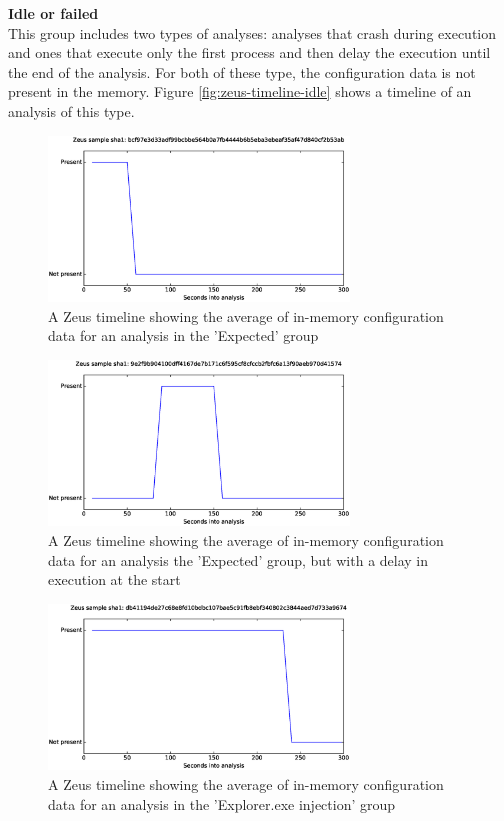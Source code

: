 \documentclass[conference]{IEEEtran}
\begin{document}
\textbf{Idle or failed}
\\This group includes two types of analyses: analyses that crash during execution and ones that execute only the first process and then delay the execution until the end of the analysis. For both of these type, the \Gls{configuration data} is not present in the memory. Figure \ref{fig:zeus-timeline-idle} shows a timeline of an analysis of this type.


\begin{figure}[h]
    \includegraphics[width=8cm,scale=0.5]{images/zeus/zeus-timelines-eps/Zeus-bcf97e3d33adf99bcbbe564b0a7fb4444b6b5eba3ebeaf35af47d840cf2b53ab.eps}
    \caption{A Zeus timeline showing the average of in-memory configuration data for an analysis in the 'Expected' group}
    \label{fig:zeus-timeline-normal}
\end{figure}
\begin{figure}[h]
    \includegraphics[width=8cm,scale=0.5]{images/zeus/zeus-timelines-eps/Zeus-9e2f9b904100dff4167de7b171c6f595cf8cfccb2fbfc6a13f90aeb970d41574.eps}
    \caption{A Zeus timeline showing the average of in-memory configuration data for an analysis the 'Expected' group, but with a delay in execution at the start}
    \label{fig:zeus-timeline-normal-delay}
\end{figure}
\begin{figure}[h]
    \includegraphics[width=8cm,scale=0.5]{images/zeus/zeus-timelines-eps/Zeus-db41194de27c68e8fd10bdbc107bae5c91fb8ebf340802c3844aed7d733a9674.eps}
    \caption{A Zeus timeline showing the average of in-memory configuration data for an analysis in the
    'Explorer.exe injection' group}
    \label{fig:zeus-timeline-injection}
\end{figure}
\end{document}
